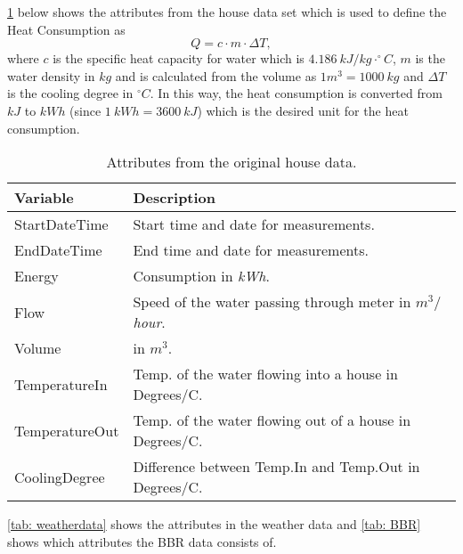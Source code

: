 \noindent \cref{tab: housedata} below shows the attributes from the house data set which is used to define the Heat Consumption as
\begin{equation}
    Q = c\cdot m \cdot \Delta T,
    \label{eq: Q_heat}
\end{equation}
where $c$ is the specific heat capacity for water which is $4.186 \ kJ/kg\cdot ^{\circ}C$, $m$ is the water density in $kg$ and is calculated from the volume as $1m^3 = 1000 \ kg$ and $\Delta T$ is the cooling degree in $^{\circ}C$. In this way, the heat consumption is converted from $kJ$ to $kWh$ (since $1 \ kWh = 3600 \ kJ$) which is the desired unit for the heat consumption. 
\begin{table}[H]
    \centering
    \begin{tabular}{ll}
     \hline
     \textbf{Variable} & \textbf{Description} \\
    \hline
    \hline
    StartDateTime  &  Start time and date for measurements.\\
    EndDateTime  &  End time and date for measurements.\\
    Energy  &  Consumption in \textit{kWh}.\\
    Flow  &  Speed of the water passing through meter in \textit{$m^3/$hour}.\\
    Volume & in $m^3$.\\
    TemperatureIn  &  Temp. of the water flowing into a house in Degrees/C. \\
    TemperatureOut  & Temp. of the water flowing out of a house in Degrees/C.\\
    CoolingDegree  &  Difference between Temp.In and Temp.Out in Degrees/C. \\
    \hline
    \end{tabular}
    \caption{Attributes from the original house data.}
    \label{tab: housedata}
\end{table}
\noindent \cref{tab: weatherdata} shows the attributes in the weather data and \cref{tab: BBR} shows which attributes the BBR data consists of.
